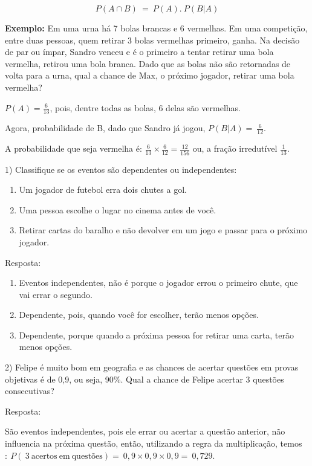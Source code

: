 \[P(A \cap B)\  = \ P(A).\ P(B|A)\]

\textbf{Exemplo:} Em uma urna há 7 bolas brancas e 6 vermelhas. Em uma
competição, entre duas pessoas, quem retirar 3 bolas vermelhas primeiro,
ganha. Na decisão de par ou ímpar, Sandro venceu e é o primeiro a tentar
retirar uma bola vermelha, retirou uma bola branca. Dado que as bolas
não são retornadas de volta para a urna, qual a chance de Max, o próximo
jogador, retirar uma bola vermelha?

\(P(A) = \frac{6}{13}\), pois, dentre todas as bolas, 6 delas são
vermelhas.

Agora, probabilidade de B, dado que Sandro já jogou,
\(P(B|A) = \ \frac{6}{12}\).

A probabilidade que seja vermelha é:
\(\frac{6}{13} \times \frac{6}{12} = \frac{12}{156}\) ou, a fração
irredutível \(\frac{1}{13}\).


1) Classifique se os eventos são dependentes ou independentes:

\begin{enumerate}
\def\labelenumi{\alph{enumi})}
\item
  Um jogador de futebol erra dois chutes a gol.
\item
  Uma pessoa escolhe o lugar no cinema antes de você.
\item
  Retirar cartas do baralho e não devolver em um jogo e passar para o
  próximo jogador.
\end{enumerate}

Resposta:

\begin{enumerate}
\def\labelenumi{\alph{enumi})}
\item
  Eventos independentes, não é porque o jogador errou o primeiro chute,
  que vai errar o segundo.
\item
  Dependente, pois, quando você for escolher, terão menos opções.
\item
  Dependente, porque quando a próxima pessoa for retirar uma carta,
  terão menos opções.
\end{enumerate}

2) Felipe é muito bom em geografia e as chances de acertar questões em
provas objetivas é de 0,9, ou seja, 90\%. Qual a chance de Felipe
acertar 3 questões consecutivas?

Resposta:

São eventos independentes, pois ele errar ou acertar a questão anterior,
não influencia na próxima questão, então, utilizando a regra da
multiplicação,
temos\(:\ P(\ 3\ \text{acertos}\ \text{em}\ \text{quest}õ\text{es}) = \ 0,9 \times 0,9 \times 0,9 = \ 0,729.\)


